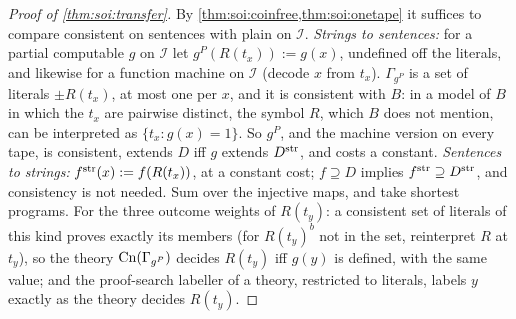\begin{proof}[Proof of \cref{thm:soi:transfer}]
By \cref{thm:soi:coinfree,thm:soi:onetape} it suffices to compare consistent \SOIabbr on sentences with plain \SOIabbr on $\mathcal I$. \emph{Strings to sentences:} for a partial computable $g$ on $\mathcal I$ let $g^P(R(t_x)):=g(x)$, undefined off the literals, and likewise for a function machine on $\mathcal I$ (decode $x$ from $t_x$). $\Gamma_{g^P}$ is a set of literals $\pm R(t_x)$, at most one per $x$, and it is consistent with $B$: in a model of $B$ in which the $t_x$ are pairwise distinct, the symbol $R$, which $B$ does not mention, can be interpreted as $\{t_x:g(x)=1\}$. So $g^P$, and the machine version on every tape, is consistent, extends $D$ iff $g$ extends $D^{\rm str}$, and costs a constant. \emph{Sentences to strings:} $f^{\rm str}(x):=f(R(t_x))$, at a constant cost; $f\supseteq D$ implies $f^{\rm str}\supseteq D^{\rm str}$, and consistency is not needed. Sum over the injective maps, and take shortest programs. For the three outcome weights of $R(t_y)$: a consistent set of literals of this kind proves exactly its members (for $R(t_y)^b$ not in the set, reinterpret $R$ at $t_y$), so the theory $\mathrm{Cn}(\Gamma_{g^P})$ decides $R(t_y)$ iff $g(y)$ is defined, with the same value; and the proof-search labeller of a theory, restricted to literals, labels $y$ exactly as the theory decides $R(t_y)$.
\end{proof}

